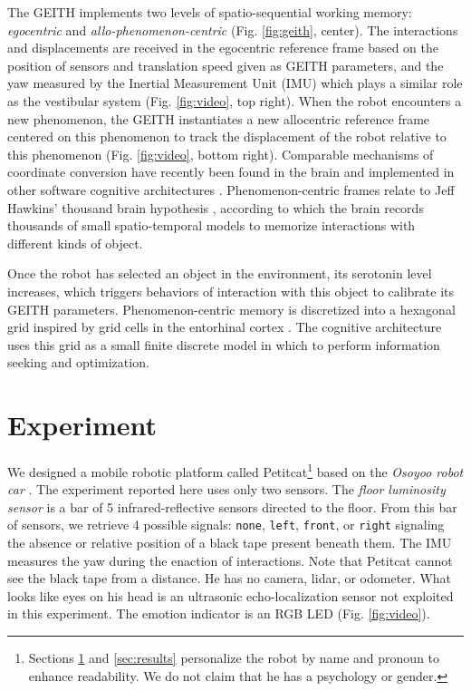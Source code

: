 \documentclass[runningheads]{llncs}
\begin{document}
The GEITH implements two levels of spatio-sequential working memory: \textit{egocentric} and \textit{allo-phenomenon-centric} (Fig. \ref{fig:geith}, center).  
The interactions and displacements are received in the egocentric reference frame based on the position of sensors and translation speed given as GEITH parameters, and the yaw measured by the Inertial Measurement Unit (IMU) which plays a similar role as the vestibular system (Fig. \ref{fig:video}, top right).
When the robot encounters a new phenomenon, the GEITH instantiates a new allocentric reference frame centered on this phenomenon to track the displacement of the robot relative to this phenomenon (Fig. \ref{fig:video}, bottom right). 
Comparable mechanisms of coordinate conversion have recently been found in the brain \cite{wang_egocentric_2020} and implemented in other software cognitive architectures \cite{schneider_emergence_2024}. 
Phenomenon-centric frames relate to Jeff Hawkins' thousand brain hypothesis \cite{hawkins_framework_2019}, according to which the brain records thousands of small spatio-temporal models to memorize interactions with different kinds of object.


Once the robot has selected an object in the environment, its serotonin level increases, which triggers behaviors of interaction with this object to calibrate its GEITH parameters. 
Phenomenon-centric memory is discretized into a hexagonal grid inspired by grid cells in the entorhinal cortex \cite{moser_place_2008}. 
The cognitive architecture uses this grid as a small finite discrete model in which to perform information seeking and optimization. %


\section{Experiment}
\label{sec:expe}

We designed a mobile robotic platform called Petitcat\footnote{Sections \ref{sec:expe} and \ref{sec:results} personalize the robot by name and pronoun to enhance readability. We do not claim that he has a psychology or gender.} based on the \textit{Osoyoo robot car} \cite{osoyoo_robot_car}.
The experiment reported here uses only two sensors.
The \textit{floor luminosity sensor} is a bar of 5 infrared-reflective sensors directed to the floor.
From this bar of sensors, we retrieve 4 possible signals:  \texttt{none},  \texttt{left},  \texttt{front}, or \texttt{right} signaling the absence or relative position of a black tape present beneath them.  
The IMU measures the yaw during the enaction of interactions.
Note that Petitcat cannot see the black tape from a distance. 
He has no camera, lidar, or odometer.
What looks like eyes on his head is an ultrasonic echo-localization sensor not exploited in this experiment. 
The emotion indicator is an RGB LED (Fig. \ref{fig:video}). 
\end{document}

